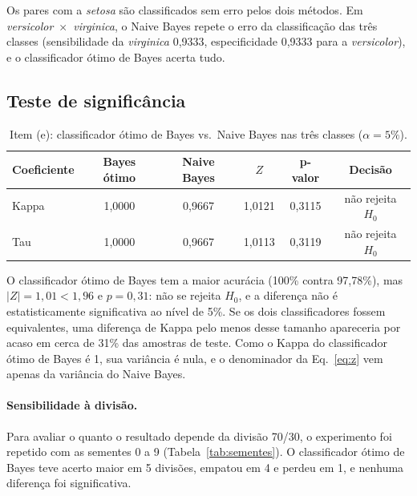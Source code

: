 \documentclass[12pt,a4paper]{article}
\newcommand{\setosa}{\emph{setosa}}
\newcommand{\versicolor}{\emph{versicolor}}
\newcommand{\virginica}{\emph{virginica}}
\begin{document}
Os pares com a \setosa{} são classificados sem erro pelos dois métodos. Em \versicolor{}~$\times$~\virginica{}, o Naive Bayes repete o erro da classificação das três classes (sensibilidade da \virginica{} 0,9333, especificidade 0,9333 para a \versicolor{}), e o classificador ótimo de Bayes acerta tudo.

\subsection{Teste de significância}\label{sec:teste}

\begin{table}[H]
\centering
\caption{Item (e): classificador ótimo de Bayes vs.\ Naive Bayes nas três classes ($\alpha = 5\%$).}
\label{tab:teste}
\begin{tabular}{lccccc}
\toprule
Coeficiente & Bayes ótimo & Naive Bayes & $Z$ & p-valor & Decisão \\
\midrule
Kappa & 1,0000 & 0,9667 & 1,0121 & 0,3115 & não rejeita $H_0$ \\
Tau   & 1,0000 & 0,9667 & 1,0113 & 0,3119 & não rejeita $H_0$ \\
\bottomrule
\end{tabular}
\end{table}

O classificador ótimo de Bayes tem a maior acurácia (100\% contra 97,78\%), mas $|Z| = 1{,}01 < 1{,}96$ e $p = 0{,}31$: não se rejeita $H_0$, e a diferença não é estatisticamente significativa ao nível de 5\%. Se os dois classificadores fossem equivalentes, uma diferença de Kappa pelo menos desse tamanho apareceria por acaso em cerca de 31\% das amostras de teste. Como o Kappa do classificador ótimo de Bayes é 1, sua variância é nula, e o denominador da Eq.~\eqref{eq:z} vem apenas da variância do Naive Bayes.

\paragraph{Sensibilidade à divisão.} Para avaliar o quanto o resultado depende da divisão 70/30, o experimento foi repetido com as sementes 0 a 9 (Tabela~\ref{tab:sementes}). O classificador ótimo de Bayes teve acerto maior em 5 divisões, empatou em 4 e perdeu em 1, e nenhuma diferença foi significativa.
\end{document}
